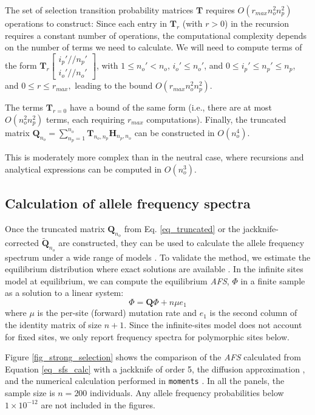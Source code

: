 \documentclass[9pt,twocolumn,twoside,lineno]{gsajnl}
\newcommand{\dslash}{/\!\!/}
\newcommand{\Coalc}[4]{\begin{bmatrix}#1\dslash #2 \\ #3\dslash #4 \end{bmatrix}}
\begin{document}
The set of selection transition probability matrices $\mathbf{T}$ requires $O(r_{max}n_o^2 n_p^2)$
operations to construct: Since each entry in $\mathbf{T}_{r}$ (with $r>0$)  in the recursion requires a
constant number of operations, the computational complexity depends on the number of terms we need
to calculate. We will need to compute terms of the form
$\mathbf{T}_{r}\Coalc{i_p'}{n_p'}{i_o'}{n_o'}$, with $1 \leq n_o'<n_o$, $i_o' \leq n_o'$, and $0\leq
i_p' \leq n_p' \leq n_p$, and $0\leq r \leq r_{max},$ leading to the bound $O(r_{max}n_o^2 n_p^2).$

The terms  $\mathbf{T}_{r=0}$ have a bound of the same form (i.e., there are at most $O(n_o^2 n_p^2)$
terms, each requiring $r_{max}$ computations).  Finally, the truncated matrix $\mathbf{Q}_{n_o} =
\sum_{n_p=1}^{n_{o}} \mathbf{T}_{n_o,n_p} \mathbf{H}_{n_p,n_o}$ can be constructed in $O(n_o^4)$.

This is moderately more complex than in the neutral case, where recursions \citep{BhaskarEtAl2014}
 and analytical expressions \citep{Lessard2010} can be computed in $O(n_o^3).$


\subsection{Calculation of allele frequency spectra}
\label{subsec_afs}

Once the truncated matrix $\mathbf{Q}_{n_o}$ from Eq. \ref{eq_truncated} or 
the jackknife-corrected  $\tilde {\mathbf{Q}}_{n_o}$ are constructed, they can be
used to calculate the allele frequency spectrum under a wide range of models \citep{JouganousEtAl2017}. 
To validate the method, we estimate the equilibrium
distribution where exact solutions are available \citep{Krukov2016}. In the infinite sites model at
equilibrium, we can compute the equilibrium \textit{AFS}, $\Phi$ in a finite sample as a solution to
a linear system:
\begin{equation}
  \label{eq_sfs_calc}
  \Phi = \mathbf{Q}\Phi  + n \mu e_1
\end{equation}
where $\mu$ is the per-site (forward) mutation rate and $e_1$ is the second column of the identity
matrix of size $n+1.$ Since the infinite-sites model does not account for fixed sites,
we only report frequency spectra for polymorphic sites below.

Figure \ref{fig_strong_selection} shows the comparison of the \textit{AFS} calculated from Equation
\ref{eq_sfs_calc} with a jackknife of order 5,
the diffusion approximation \cite[eq. 9.23]{Ewens2004}, and the numerical
calculation performed in \texttt{moments} \citep{JouganousEtAl2017}. In all the panels, the sample
size is $n=200$ individuals. Any allele frequency probabilities below $1\times10^{-12}$ are not
included in the figures. 
\end{document}
